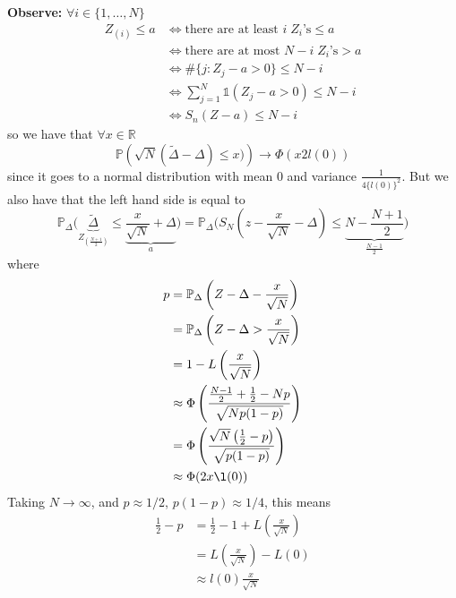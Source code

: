 \documentclass[a4paper,12pt]{amsart}
\newcommand{\sumjN}{\sum_{j=1}^N}
\newcommand{\p}[1]{\mathbb{P}\left(#1\right)}
\begin{document}
\bigskip \noindent
\textbf{Observe:} $\forall i \in \{1, \ldots, N\}$\\
\begin{align*}
Z_{(i)} \leq a &\Leftrightarrow \text{there are at least } i\; Z_i\text{'s} \leq a\\
&\Leftrightarrow \text{there are at most } N-i\; Z_i\text{'s} > a\\
&\Leftrightarrow \#\{j: Z_j - a >0\} \leq N-i\\
&\Leftrightarrow \sumjN \mathds{1}(Z_j - a >0) \leq N-i\\
&\Leftrightarrow S_n(Z-a) \leq N-i
\end{align*}
so we have that $\forall x \in \mathbb{R}$
\[\p{\sqrt{N}(\tilde{\Delta} - \Delta) \leq x)} \to \Phi(x2l(0))\]
since it goes to a normal distribution with mean 0 and variance $\frac{1}{4\{l(0)\}^2}$.
But we also have that the left hand side is equal to 
\[\mathbb{P}_\Delta\bigg(\underbrace{\tilde{\Delta}}_{Z_{\left(\frac{N+1}{2}\right)}} \leq \underbrace{\frac{x}{\sqrt{N}} + \Delta}_a\bigg) = \mathbb{P}_\Delta \bigg(S_N \left(z - \frac{x}{\sqrt{N}} - \Delta \right) \leq \underbrace{N - \frac{N+1}{2}}_{\frac{N-1}{2}}\bigg)\]
where
\begin{align*}
p&=\mathbb{P}_\Delta\left(Z - \Delta - \frac{x}{\sqrt{N}}\right)\\
&= \mathbb{P}_\Delta\left(Z - \Delta > \frac{x}{\sqrt{N}}\right)\\
&= 1 - L\left(\frac{x}{\sqrt{N}}\right)\\
&\approx \Phi\left(\frac{\frac{N-1}{2} + \frac{1}{2} - Np}{\sqrt{Np(1-p)}}\right)\\
&= \Phi\left(\frac{\sqrt{N}\left(\frac{1}{2} -p\right)}{\sqrt{p(1-p)}}\right)\\
&\approx \Phi(2x \l(0))
\end{align*}
Taking $N \to \infty$, and $p \approx 1/2$, $p(1-p) \approx 1/4$, this means
\begin{align*}
\frac{1}{2}-p &= \frac{1}{2} - 1 + L\left(\frac{x}{\sqrt{N}}\right)\\
&= L\left(\frac{x}{\sqrt{N}}\right) - L(0)\\
&\approx l(0) \frac{x}{\sqrt{N}}
\end{align*}
\end{document}
